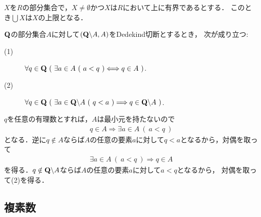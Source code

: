 	$X$を$R$の部分集合で，$X \neq \emptyset$かつ$X$は$R$において上に有界であるとする．
	このとき$\bigcup X$は$X$の上限となる．
	
	\begin{screen}
		\begin{thm}
			$\mathbf{Q}$の部分集合$A$に対して$(\mathbf{Q} \backslash A,A)$をDedekind切断とするとき，
			次が成り立つ:
			\begin{description}
				\item[(1)] $\forall q \in \mathbf{Q}\ (\ \exists a \in A\ (\ a < q\ )\Longleftrightarrow q \in A\ )$.
				\item[(2)] $\forall q \in \Q\ (\ \exists a \in \Q \backslash A\ (\ q < a\ )\Longrightarrow q \in \Q \backslash A\ )$.
			\end{description}
		\end{thm}
	\end{screen}
	
	\begin{prf}
		$q$を任意の有理数とすれば，$A$は最小元を持たないので
		\begin{align}
			q \in A \Longrightarrow \exists a \in A\ (\ a < q\ )
		\end{align}
		となる．逆に$q \notin A$ならば$A$の任意の要素$a$に対して$q < a$となるから，対偶を取って
		\begin{align}
			\exists a \in A\ (\ a < q\ ) \Longrightarrow q \in A
		\end{align}
		を得る．$q \notin \mathbf{Q} \backslash A$ならば$A$の任意の要素$a$に対して$a < q$となるから，
		対偶を取って(2)を得る．
		\QED
	\end{prf}

\subsection{複素数}